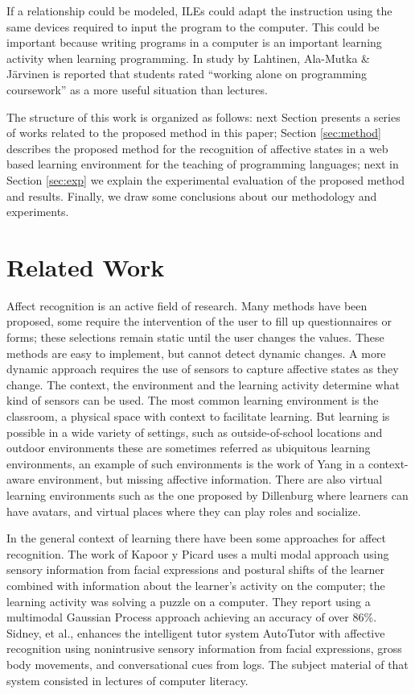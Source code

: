 \documentclass[a4paper]{llncs}
\begin{document}
If a relationship could be modeled, ILEs could adapt the instruction using the
same devices required to input the program to the computer. This could be
important because writing programs in a computer is an important learning
activity when learning programming. In study by Lahtinen, Ala-Mutka \& Järvinen
\cite{lahtinen2005study} is reported that students rated ``working alone on programming
coursework'' as a more useful situation than lectures.

The structure of this work is organized as follows: next Section 
presents a series of works related to the proposed method in this paper; Section
\ref{sec:method} describes the proposed method for the recognition of affective
states in a web based learning environment for the teaching of programming
languages; next in Section \ref{sec:exp} we explain the experimental evaluation of the
proposed method and results.
Finally, we draw some conclusions about our methodology and
experiments. 


\section{Related Work}

Affect recognition is an active field of research. Many
methods have been proposed, some require the intervention of the user to fill up
questionnaires or forms; these selections remain static until the user changes
the values. These methods are easy to implement, but cannot detect dynamic
changes.  A more dynamic approach requires the use of sensors to capture
affective states as they change. The context, the environment and the learning
activity determine what kind of sensors can be used. The most common learning
environment is the classroom, a physical space with context to facilitate
learning. But learning is possible in a wide variety of settings, such as
outside-of-school locations and outdoor environments these are sometimes
referred as ubiquitous learning environments, an example of such environments is
the work of Yang \cite{yang2006context} in a context-aware environment, but missing affective
information. There are also virtual learning environments such as the one proposed by Dillenburg
\cite{dillenbourg2002virtual}  where learners can have avatars, and virtual places
where they can play roles and socialize.

In the general context of learning there have been some approaches for affect
recognition. The work of Kapoor y Picard \cite{kapoor2005multimodal} uses a multi modal
approach using sensory information from facial expressions and postural shifts
of the learner combined with information about the learner's activity on the
computer; the learning activity was solving a puzzle on a computer. They report
using a multimodal Gaussian Process approach achieving an accuracy of over 86\%.
Sidney, et al., \cite{sidney2005integrating} enhances the intelligent tutor system AutoTutor with
affective recognition using nonintrusive sensory information from facial
expressions, gross body movements, and conversational cues from logs.  The
subject material of that system consisted in lectures of computer literacy.
\end{document}
